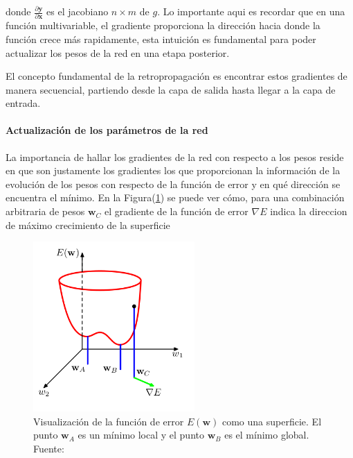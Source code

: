         donde $\frac{\partial \mathbf{y}}{\partial \mathbf{x}}$ es el jacobiano $n \times m$ de $g$. Lo importante aqui 
        es recordar que en una función multivariable, el gradiente proporciona la dirección hacia donde la función crece 
        más rapidamente, esta intuición es fundamental para poder actualizar los pesos de la red en una etapa posterior.

        El concepto fundamental de la retropropagación es encontrar estos gradientes de manera secuencial, partiendo desde 
        la capa de salida hasta llegar a la capa de entrada. 

            \paragraph{Actualización de los parámetros de la red}
            La importancia de hallar los gradientes de la red con respecto a los pesos reside en que son justamente 
            los gradientes los que proporcionan la información de la evolución de los pesos con respecto de la función 
            de error y en qué dirección se encuentra el mínimo. En la Figura(\ref{fig:gradsup}) se puede ver cómo, para 
            una combinación arbitraria de pesos $\mathbf{w}_C$ el gradiente de la función de error $\nabla E$ indica 
            la direccion de máximo crecimiento de la superficie

            \begin{figure}[!h] 
                \centering
                \includegraphics[width=0.55\textwidth]{img/gradsup}
                \caption{Visualización de la función de error $E(\mathbf{w})$ como una superficie. El punto $\mathbf{w}_A$ es un mínimo local y el punto $\mathbf{w}_B$ es el mínimo global. Fuente: \cite{Bishop2006} }
                \label{fig:gradsup}
            \end{figure}

